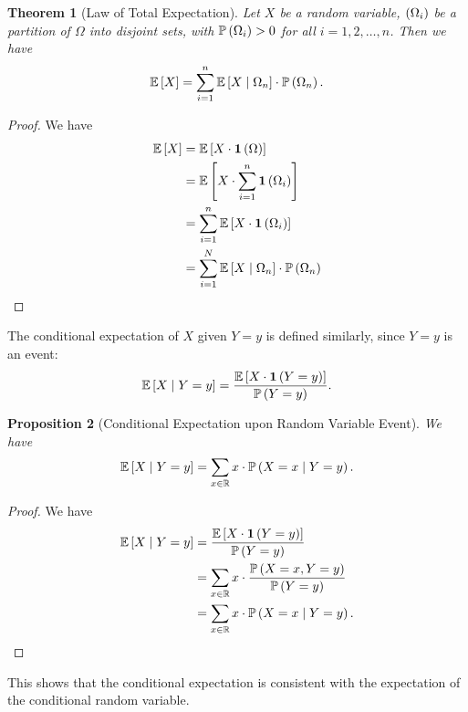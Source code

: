 \documentclass{article}
\newtheorem{theorem}{Theorem}[section]
\newtheorem{proposition}[theorem]{Proposition}
\theoremstyle{definition}
\theoremstyle{remark}
\newcommand{\RR}{\mathbb{R}}
\newcommand{\Prob}{\mathbb{P}}
\newcommand{\Expt}{\mathbb{E}}
\newcommand{\Conditional}[2]{#1\mid #2}
\newcommand{\indicator}{\mathbf{1}}
\begin{document}
\begin{theorem}[Law of Total Expectation]
    \label{thm:law-of-total-expectation}%
    Let \(X\) be a random variable, \(\left(\Omega_i\right)\) be a partition of \(\Omega\) into disjoint sets, with \(\Prob\pqty{\Omega_i} > 0\) for all \(i = 1, 2, \ldots ,n\). Then we have
    \[
        \Expt\bqty{X} = \sum_{i = 1}^{n} \Expt\bqty{\Conditional{X}{\Omega_n}} \cdot \Prob\pqty{\Omega_n}.
    \]
\end{theorem}

\begin{proof}
    We have
    \begin{align*}
        \Expt\bqty{X} &= \Expt\bqty{X \cdot \indicator\pqty{\Omega}} \\
        &= \Expt\bqty{X \cdot \sum_{i = 1}^{n} \indicator \pqty{\Omega_i}} \\
        &= \sum_{i = 1}^{n} \Expt\bqty{X \cdot \indicator \pqty{\Omega_i}} \\
        &= \sum_{i = 1}^{N} \Expt\bqty{\Conditional{X}{\Omega_n}} \cdot \Prob\pqty{\Omega_n}
    \end{align*}
\end{proof}

The conditional expectation of \(X\) given \(Y = y\) is defined similarly, since \(Y = y\) is an event:
\[
    \Expt\bqty{\Conditional{X}{Y = y}} = \frac{\Expt\bqty{X \cdot \indicator\pqty{Y = y}}}{\Prob\pqty{Y = y}}.
\]

\begin{proposition}[Conditional Expectation upon Random Variable Event]
    \label{prop:conditional-expectation-random-variable}%
    We have
    \[
        \Expt\bqty{\Conditional{X}{Y = y}} = \sum_{x \in \RR} x \cdot \Prob\pqty{\Conditional{X = x}{Y = y}}.
    \]
\end{proposition}

\begin{proof}
    We have
    \begin{align*}
        \Expt\bqty{\Conditional{X}{Y = y}} &= \frac{\Expt\bqty{X \cdot \indicator\pqty{Y = y}}}{\Prob\pqty{Y = y}} \\
        &= \sum_{x \in \RR} x \cdot \frac{\Prob\pqty{X = x, Y = y}}{\Prob\pqty{Y = y}} \\
        &= \sum_{x \in \RR} x \cdot \Prob\pqty{\Conditional{X = x}{Y = y}}.
    \end{align*}
\end{proof}

This shows that the conditional expectation is consistent with the expectation of the conditional random variable.
\end{document}
